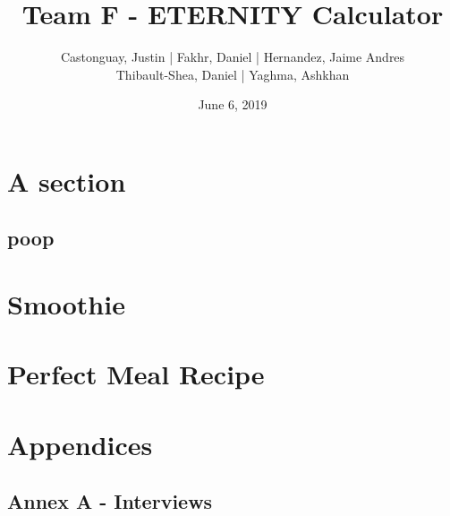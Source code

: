 \documentclass[a4paper]{article}
\begin{document}
\title{\LARGE{\textbf{Team F - ETERNITY Calculator}}}
\author{
	Castonguay, Justin | Fakhr, Daniel | Hernandez, Jaime Andres \\ Thibault-Shea, Daniel |
	Yaghma, Ashkhan \\
}
\date{June 6, 2019}

\fancyhf{}

\clearpage\maketitle
\thispagestyle{empty} %
\pagebreak

\setcounter{page}{2} %
\fancyhf{}
\renewcommand{\headrulewidth}{2pt}
\renewcommand{\footrulewidth}{1pt}
\fancyhead[LE,RO]{\rightmark}
\tableofcontents
\pagebreak

\section{A section}
\blindtext[2]

\subsection{poop}

\section{Smoothie}
\blindtext[2]

\section{Perfect Meal Recipe}


\section{Appendices}
\blindtext[1]

\subsection{Annex A - Interviews}

\clearpage
\glsaddallunused
\printnoidxglossaries
 
\end{document}
